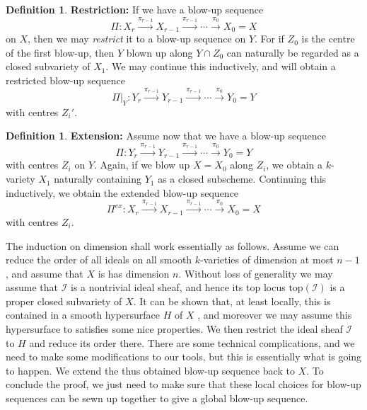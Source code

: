 \documentclass[12pt,a4paper,leqno]{article}
\theoremstyle{plain}
\theoremstyle{definition}
\newtheorem{defn}[theo]{Definition}
\theoremstyle{remark}
\begin{document}
\begin{defn}
\textbf{Restriction:} If we have a blow-up sequence 
\begin{equation*}
\Pi: X_{r} \stackrel{\pi_{r-1}}{\to} X_{r-1} \stackrel{\pi_{r-1}}{\to} \cdots \stackrel{\pi_0}{\to} X_0 = X
\end{equation*}
on $X$, then we may \emph{restrict} it to a blow-up sequence on $Y$. For if $Z_0$ is the centre of the first blow-up, then $Y$ blown up along $Y \cap Z_0$ can naturally be regarded as a closed subvariety of $X_1$. We may continue this inductively, and will obtain a restricted blow-up sequence
\begin{equation*}
\Pi|_Y: Y_{r} \stackrel{\pi_{r-1}}{\to} Y_{r-1} \stackrel{\pi_{r-1}}{\to} \cdots \stackrel{\pi_0}{\to} Y_0 = Y
\end{equation*}
with centres $Z_i'$.
\end{defn}

\begin{defn}
\textbf{Extension:} Assume now that we have a blow-up sequence 
\begin{equation*}
\Pi: Y_{r} \stackrel{\pi_{r-1}}{\to} Y_{r-1} \stackrel{\pi_{r-1}}{\to} \cdots \stackrel{\pi_0}{\to} Y_0 = Y
\end{equation*}
with centres $Z_i$ on $Y$. Again, if we blow up $X=X_0$ along $Z_i$, we obtain a $k$-variety $X_1$ naturally containing $Y_1$ as a closed subscheme. Continuing this inductively, we obtain the extended blow-up sequence 
\begin{equation*}
\Pi^{ex}: X_{r} \stackrel{\pi_{r-1}}{\to} X_{r-1} \stackrel{\pi_{r-1}}{\to} \cdots \stackrel{\pi_0}{\to} X_0 = X
\end{equation*}
with centres $Z_i$.
\end{defn}

The induction on dimension shall work essentially as follows. Assume we can reduce the order of all ideals on all smooth $k$-varieties of dimension at most $n-1$, and assume that $X$ is has dimension $n$. Without loss of generality we may assume that $\mathscr{I}$ is a nontrivial ideal sheaf, and hence its top locus $\mathrm{top} (\mathscr{I})$ is a proper closed subvariety of $X$. It can be shown that, at least locally, this is contained in a smooth hypersurface $H$ of $X$ , and moreover we may assume this hypersurface to satisfies some nice properties. We then restrict the ideal sheaf $\mathscr{I}$ to $H$ and reduce its order there. There are some technical complications, and we need to make some modifications to our tools, but this is essentially what is going to happen. We extend the thus obtained blow-up sequence back to $X$. To conclude the proof, we just need to make sure that these local choices for blow-up sequences can be sewn up together to give a global blow-up sequence.
\end{document}
